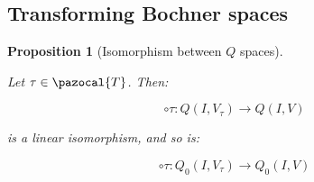 \documentclass[english,a4paper,9pt,oneside]{scrbook}	%
\theoremstyle{break}
\newtheorem{prop}[equation]{Proposition}
\theoremstyle{remark}
\newcommand{\norm}[1]{\left\lVert#1\right\rVert}
\newcommand{\tr}{\text{tr}}
\newcommand{\cT}{\pazocal{T}}
\newcommand{\tred}[1]{\textcolor{red}{#1}}
\begin{document}
\begin{appendices}
%
%
%
%
%
%
%
%
%
%		
%

\section{Transforming Bochner spaces}

\begin{prop}[Isomorphism between $Q$ spaces]
\label{prop:change_boch}

Let $\tau \in \cT$. Then:

$$\circ \tau : Q(I,V_\tau)\rightarrow Q(I,V)$$

is a linear isomorphism, and so is:

$$\circ \tau : Q_0(I,V_\tau)\rightarrow Q_0(I,V)$$


\end{prop}
\end{appendices}
\end{document}
